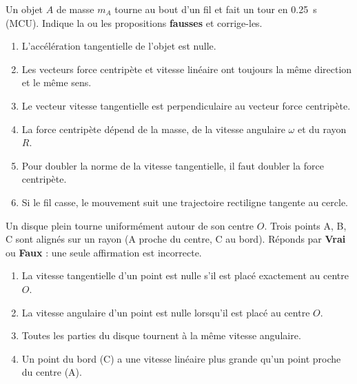 \documentclass[11pt,a4paper]{article}
\begin{document}

\begin{exo}
Un objet $A$ de masse $m_A$ tourne au bout d'un fil et fait un tour en \qty{0,25}{\second} (MCU).
Indique la ou les propositions \textbf{fausses} et corrige-les.
\begin{enumerate}[label=\Alph*.]
  \item L'accélération tangentielle de l'objet est nulle.
  \item Les vecteurs force centripète et vitesse linéaire ont toujours la même direction et le même sens.
  \item Le vecteur vitesse tangentielle est perpendiculaire au vecteur force centripète.
  \item La force centripète dépend de la masse, de la vitesse angulaire $\omega$ et du rayon $R$.
  \item Pour doubler la norme de la vitesse tangentielle, il faut doubler la force centripète.
  \item Si le fil casse, le mouvement suit une trajectoire rectiligne tangente au cercle.
\end{enumerate}
\end{exo}

\begin{exo}
Un disque plein tourne uniformément autour de son centre $O$. Trois points A, B, C sont alignés sur un
rayon (A proche du centre, C au bord). Réponds par \textbf{Vrai} ou \textbf{Faux} : une seule affirmation
est incorrecte.
\begin{center}
\end{center}
\begin{enumerate}[label=\Alph*.]
  \item La vitesse tangentielle d'un point est nulle s'il est placé exactement au centre $O$.
  \item La vitesse angulaire d'un point est nulle lorsqu'il est placé au centre $O$.
  \item Toutes les parties du disque tournent à la même vitesse angulaire.
  \item Un point du bord (C) a une vitesse linéaire plus grande qu'un point proche du centre (A).
\end{enumerate}
\end{exo}
\end{document}
